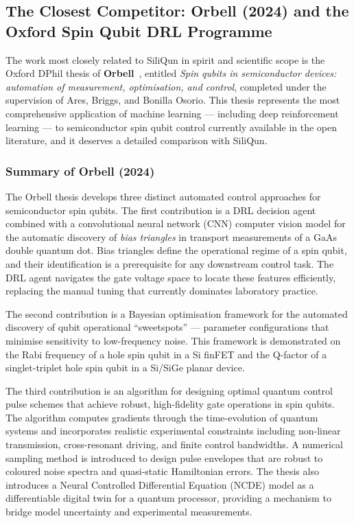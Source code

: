 \subsection{The Closest Competitor: Orbell (2024) and the Oxford Spin Qubit DRL Programme}
\label{sec:rw_oxford}

The work most closely related to SiliQun in spirit and scientific scope is
the Oxford DPhil thesis of \textbf{Orbell}~\cite{Orbell2024}, entitled
\emph{Spin qubits in semiconductor devices: automation of measurement,
optimisation, and control}, completed under the supervision of Ares,
Briggs, and Bonilla Osorio. This thesis represents the most comprehensive
application of machine learning — including deep reinforcement learning —
to semiconductor spin qubit control currently available in the open
literature, and it deserves a detailed comparison with SiliQun.

\subsubsection{Summary of Orbell (2024)}

The Orbell thesis develops three distinct automated control approaches for
semiconductor spin qubits. The first contribution is a DRL decision agent
combined with a convolutional neural network (CNN) computer vision model
for the automatic discovery of \emph{bias triangles} in transport
measurements of a GaAs double quantum dot. Bias triangles define the
operational regime of a spin qubit, and their identification is a
prerequisite for any downstream control task. The DRL agent navigates the
gate voltage space to locate these features efficiently, replacing the
manual tuning that currently dominates laboratory practice.

The second contribution is a Bayesian optimisation framework for the
automated discovery of qubit operational ``sweetspots'' — parameter
configurations that minimise sensitivity to low-frequency noise. This
framework is demonstrated on the Rabi frequency of a hole spin qubit in a
Si finFET and the Q-factor of a singlet-triplet hole spin qubit in a
Si/SiGe planar device.

The third contribution is an algorithm for designing optimal quantum control
pulse schemes that achieve robust, high-fidelity gate operations in spin
qubits. The algorithm computes gradients through the time-evolution of
quantum systems and incorporates realistic experimental constraints
including non-linear transmission, cross-resonant driving, and finite
control bandwidths. A numerical sampling method is introduced to design
pulse envelopes that are robust to coloured noise spectra and quasi-static
Hamiltonian errors. The thesis also introduces a Neural Controlled
Differential Equation (NCDE) model as a differentiable digital twin for a
quantum processor, providing a mechanism to bridge model uncertainty and
experimental measurements.

